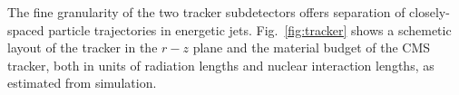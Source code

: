 
The fine granularity of the two tracker subdetectors offers separation of closely-spaced particle
trajectories in energetic jets. Fig.~\ref{fig:tracker} shows a
schemetic layout of the tracker in the $r-z$ plane and
the material budget of the CMS tracker, both in units of radiation
lengths and nuclear interaction lengths, as estimated from
simulation. 

